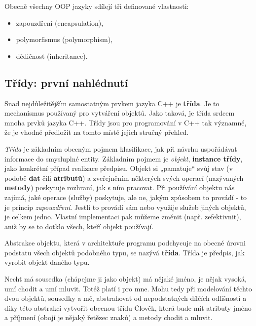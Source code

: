     Obecně všechny OOP jazyky sdílejí tři definované vlastnosti:
    \begin{itemize}\addtolength{\itemsep}{-0.5\baselineskip}
      \item zapouzdření (encapsulation),
      \item polymorfismus (polymorphism),
      \item dědičnost (inheritance).
    \end{itemize}
  
    \subsection{Třídy: první nahlédnutí}
      Snad nejdůležitějším samostatným prvkem jazyka C++ je \textbf{třída}. Je to mechanismus 
      používaný pro vytváření objektů. Jako taková, je třída srdcem mnoha prvků jazyka C++. Třídy 
      jsou pro programování v C++ tak významné, že je vhodné předložit na tomto místě jejich 
      stručný 
      přehled.
  
      \begin{definition}[Třída]
        \emph{Třída} je základním obecným pojmem klasifikace, jak při návrhu uspořádávat informace 
        do smysluplné entity. Základním pojmem je \emph{objekt}, \textbf{instance třídy}, jako 
        konkrétní případ realizace předpisu. Objekt si „pamatuje“ svůj stav (v podobě \textbf{dat} 
        čili \textbf{atributů}) a zveřejněním některých svých operací (nazývaných \textbf{metody}) 
        poskytuje rozhraní, jak s ním pracovat. Při používání objektu nás zajímá, jaké operace 
        (služby) poskytuje, ale ne, jakým způsobem to provádí - to je princip \emph{zapouzdření}. 
        Jestli to provádí sám nebo využije služeb jiných objektů, je celkem jedno. Vlastní 
        implementaci pak můžeme změnit (např. zefektivnit), aniž by se to dotklo všech, kteří 
        objekt používají.
  
        Abstrakce objektu, která v architektuře programu podchycuje na obecné úrovni podstatu všech 
        objektů podobného typu, se nazývá \textbf{třída}. Třída je předpis, jak vyrobit objekt 
        daného typu.
      \end{definition}
      
      \begin{example}
        Nechť má sousedka (chápejme ji jako objekt) má nějaké jméno, je nějak vysoká, umí chodit a 
        umí mluvit. Totéž platí i pro mne. Mohu tedy při modelování těchto dvou objektů, sousedky a 
        mě, abstrahovat od nepodstatných dílčích odlišností a díky této abstrakci vytvořit obecnou 
        třídu Člověk, která bude mít atributy jméno a příjmení (obojí je nějaký řetězec znaků) a 
        metody chodit a mluvit.
      \end{example}
  
